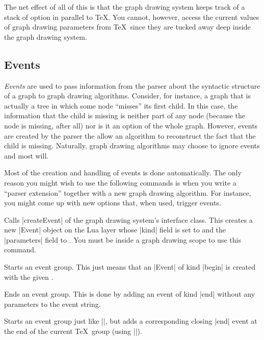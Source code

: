 The net effect of all of this is that the graph drawing system keeps track of a
stack of option in parallel to \TeX. You cannot, however, access the current
values of graph drawing parameters from \TeX\ since they are tucked away deep
inside the graph drawing system.


\subsection{Events}

\emph{Events} are used to pass information from the parser about the syntactic
structure of a graph to graph drawing algorithms. Consider, for instance, a
graph that is actually a tree in which some node ``misses'' its first child. In
this case, the information that the child is missing is neither part of any
node (because the node is missing, after all) nor is it an option of the whole
graph. However, events are created by the parser the allow an algorithm to
reconstruct the fact that the child is missing. Naturally, graph drawing
algorithms may choose to ignore events and most will.

Most of the creation and handling of events is done automatically. The only
reason you might wish to use the following commands is when you write a
``parser extension'' together with a new graph drawing algorithm. For instance,
you might come up with new options that, when used, trigger events.

\begin{command}{\pgfgdevent{}}
    Calls |createEvent| of the graph drawing system's interface class. This
    creates a new |Event| object on the Lua layer whose |kind| field is set to
     and the |parameters| field to . You must be
    inside a graph drawing scope to use this command.
\end{command}

\begin{command}{\pgfgdbegineventgroup{}}
    Starts an event group. This just means that an |Event| of kind |begin| is
    created with the given .
\end{command}

\begin{command}{\pgfgdendeventgroup}
    Ends an event group. This is done by adding an event of kind |end| without
    any parameters to the event string.
\end{command}

\begin{command}{\pgfgdeventgroup{}}
    Starts an event group just like |\pgfgdbegineventgroup|, but adds a
    corresponding closing |end| event at the end of the current \TeX\ group
    (using |\aftergroup|).
\end{command}


